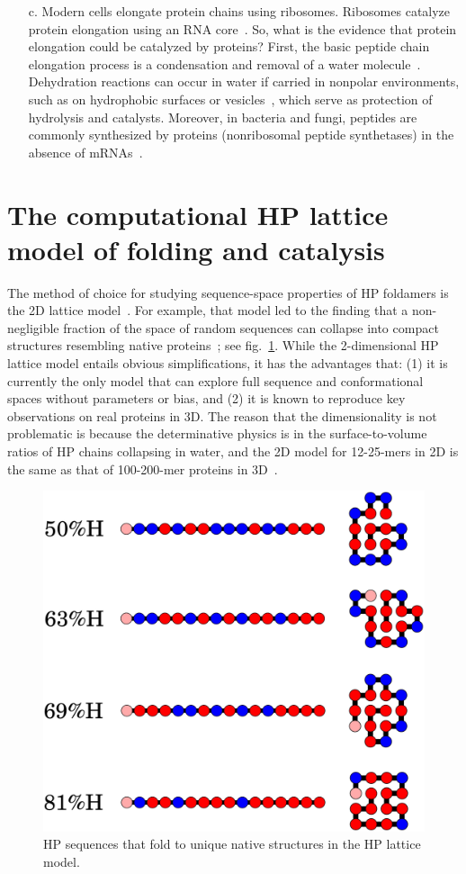 \documentclass[5p,times]{elsarticle}
\begin{document}
\begin{itemize}
\item [c.] Modern cells elongate protein chains using 
ribosomes.  Ribosomes catalyze protein elongation using an RNA core~\cite{Nissen2000}.  So, what is 
the evidence that protein elongation could be catalyzed by proteins?  First, the basic peptide 
chain elongation process is a condensation and removal of a water 
molecule~\cite[chapter 3, p.~82]{Nelson2008}.  Dehydration reactions can occur in water if carried 
in nonpolar environments, such as on hydrophobic surfaces or 
vesicles~\cite{Manabe2001,Manabe2002}, which serve as protection of hydrolysis and catalysts.  
Moreover, in bacteria and fungi, peptides are commonly synthesized by proteins (nonribosomal 
peptide synthetases) in the absence of mRNAs~\cite{Stachelhaus1998,marahiel2009working}.
\end{itemize}

\section{The computational HP lattice model of folding and catalysis}

 The method of choice for studying sequence-space properties of HP foldamers is the 2D lattice 
model~\cite{lau1989lattice,Chan1991}.  For example, that model led to the finding that a 
non-negligible fraction of the space of random sequences can collapse into compact structures 
resembling native proteins~\cite{lau1989lattice}; see fig.~\ref{fig:hydro-effect}.  While the 
2-dimensional HP lattice model entails obvious simplifications, it has the advantages that: (1) it 
is currently the only model that can explore full sequence and conformational spaces without 
parameters or bias, and (2) it is known to reproduce key observations on real proteins in 3D. The 
reason that the dimensionality is not problematic is because the determinative physics is in the 
surface-to-volume ratios of HP chains collapsing in water, and the 2D model for 12-25-mers in 2D is 
the same as that of 100-200-mer proteins in 3D~\cite{Giugliarelli2000}.
\begin{figure}[h!]
  \centering
  \includegraphics[width=0.8\columnwidth]{pictures/tst-seqs.pdf} 
  \caption{\footnotesize{HP sequences that fold to unique native structures in the HP 
lattice model.}}
  \label{fig:hydro-effect}
\end{figure}
\end{document}
